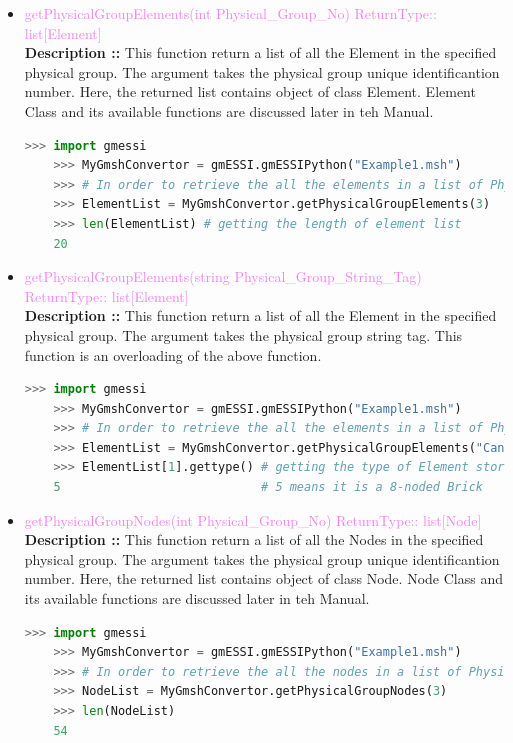 \documentclass[11pt]{article}
\begin{document}
\begin{itemize}
    \item \textcolor{violet}{ getPhysicalGroupElements(int Physical\_Group\_No) \hfill {ReturnType:: list[Element]}} \\
    \textbf{Description ::} This function return a list of all the Element in the specified physical group. The argument takes the physical group unique identificantion number. Here, the returned list contains object of class Element. Element Class and its available functions are discussed later in teh Manual.
    \begin{lstlisting}[language=Python]
    >>> import gmessi
    >>> MyGmshConvertor = gmESSI.gmESSIPython("Example1.msh")
    >>> # In order to retrieve the all the elements in a list of Physical group of Id 3 "CantileverVolume"
    >>> ElementList = MyGmshConvertor.getPhysicalGroupElements(3)
    >>> len(ElementList) # getting the length of element list
    20
    \end{lstlisting}

    \item \textcolor{violet}{ getPhysicalGroupElements(string Physical\_Group\_String\_Tag) \hfill {ReturnType:: list[Element]}} \\
    \textbf{Description ::} This function return a list of all the Element in the specified physical group. The argument takes the physical group string tag. This function is an overloading of the above function.
    \begin{lstlisting}[language=Python]
    >>> import gmessi
    >>> MyGmshConvertor = gmESSI.gmESSIPython("Example1.msh")
    >>> # In order to retrieve the all the elements in a list of Physical group of Id 3 "CantileverVolume"
    >>> ElementList = MyGmshConvertor.getPhysicalGroupElements("CantileverVolume")
    >>> ElementList[1].gettype() # getting the type of Element stored in the list at index 1.
    5                            # 5 means it is a 8-noded Brick
    \end{lstlisting}

    \item \textcolor{violet}{ getPhysicalGroupNodes(int Physical\_Group\_No) \hfill {ReturnType:: list[Node]}} \\
    \textbf{Description ::} This function return a list of all the Nodes in the specified physical group. The argument takes the physical group unique identificantion number. Here, the returned list contains object of class Node. Node Class and its available functions are discussed later in teh Manual.
    \begin{lstlisting}[language=Python]
    >>> import gmessi
    >>> MyGmshConvertor = gmESSI.gmESSIPython("Example1.msh")
    >>> # In order to retrieve the all the nodes in a list of Physical group of Id 3 "CantileverVolume"
    >>> NodeList = MyGmshConvertor.getPhysicalGroupNodes(3)
    >>> len(NodeList)
    54
    \end{lstlisting}


\end{itemize}
\end{document}
